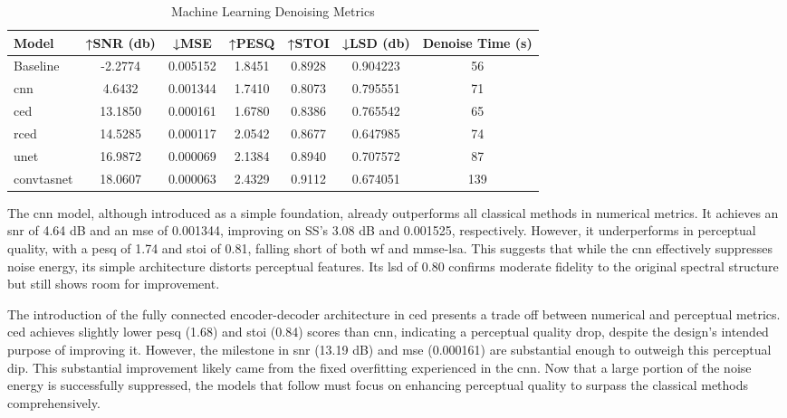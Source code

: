 \vspace{1em}
\begin{table}[H]
\centering
\caption{Machine Learning Denoising Metrics}
\label{tab:ml_denoise}
\begin{tabular}{|l|c|c|c|c|c|c|}
\hline
\textbf{Model} & \textbf{↑SNR (db)} & \textbf{↓MSE} & \textbf{↑PESQ} & \textbf{↑STOI} & \textbf{↓LSD (db)} & \textbf{Denoise Time (s)} \\
\hline
Baseline     & -2.2774 & 0.005152 & 1.8451 & 0.8928 & 0.904223 & 56 \\
\gls{cnn}         & 4.6432  & 0.001344 & 1.7410 & 0.8073 & 0.795551 & 71 \\
\gls{ced}         & 13.1850  & 0.000161 & 1.6780 & 0.8386 & 0.765542 & 65 \\
\gls{rced}        & 14.5285  & 0.000117 & 2.0542 & 0.8677 & 0.647985 & 74 \\
\gls{unet}        & 16.9872  & 0.000069 & 2.1384 & 0.8940 & 0.707572 & 87 \\
\gls{convtasnet}  & 18.0607 & 0.000063 & 2.4329 & 0.9112 & 0.674051 & 139 \\
\hline
\end{tabular}
\end{table}

The \gls{cnn} model, although introduced as a simple foundation, already outperforms all classical methods in numerical metrics. It achieves an \gls{snr} of 4.64 dB and an \gls{mse} of 0.001344, improving on SS’s 3.08 dB and 0.001525, respectively. However, it underperforms in perceptual quality, with a \gls{pesq} of 1.74 and \gls{stoi} of 0.81, falling short of both \gls{wf} and \gls{mmse-lsa}. This suggests that while the \gls{cnn} effectively suppresses noise energy, its simple architecture distorts perceptual features. Its \gls{lsd} of 0.80 confirms moderate fidelity to the original spectral structure but still shows room for improvement.

The introduction of the fully connected encoder-decoder architecture in \gls{ced} presents a trade off between numerical and perceptual metrics. \gls{ced} achieves slightly lower \gls{pesq} (1.68) and \gls{stoi} (0.84) scores than \gls{cnn}, indicating a perceptual quality drop, despite the design's intended purpose of improving it. However, the milestone in \gls{snr} (13.19 dB) and \gls{mse} (0.000161) are substantial enough to outweigh this perceptual dip. This substantial improvement likely came from the fixed overfitting experienced in the \gls{cnn}. Now that a large portion of the noise energy is successfully suppressed, the models that follow must focus on enhancing perceptual quality to surpass the classical methods comprehensively.


